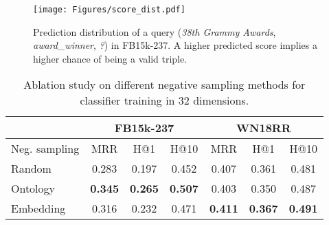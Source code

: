 \documentclass{article}
\begin{document}
\begin{table*}[t]
\setlength\tabcolsep{3pt}
\centering
{}
\caption{Comparison on performance, number of model parameters, and
total inference time (batch size = 8) with other classification-based methods in 128
dimensions. We adopt TransE as the baseline for fair 
comparison in the number of model parameters. The best numbers are in bold.} 
\label{tab:cls}
\end{table*}


\begin{figure}[t]
\centering
\texttt{[image: Figures/score\_dist.pdf]}
\caption{Prediction distribution of a query (\emph{38th Grammy Awards}, \emph{award\_winner}, \emph{?}) in FB15k-237. A higher predicted score implies a higher chance of being a valid triple. }
\label{fig:distribution}
\end{figure}


\begin{table}[t]
\setlength\tabcolsep{3pt}
\centering
\begin{tabular}{l | c  c  c | c  c  c}
\hline
& \multicolumn{3}{c|}{\textbf{FB15k-237}} & \multicolumn{3}{c}{\textbf{WN18RR}} \\
\hline
Neg. sampling & MRR & H@1 & H@10 & MRR & H@1 & H@10\\
\hline
Random        & 0.283 & 0.197 & 0.452 & 0.407 & 0.361 & 0.481 \\
Ontology      & {\bf 0.345} & {\bf 0.265} & {\bf 0.507} & 0.403 & 0.350 & 0.487 \\
Embedding     & 0.316 & 0.232 & 0.471 & {\bf 0.411} & {\bf 0.367} & {\bf 0.491} \\
\hline
\end{tabular}
\caption{Ablation study on different negative sampling methods for classifier 
training in 32 dimensions.}\label{tab:neg}
\end{table}
\end{document}
